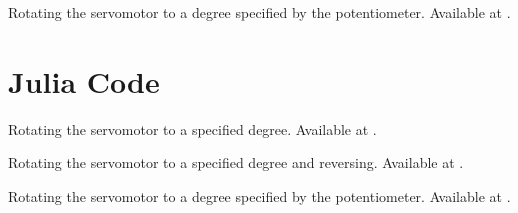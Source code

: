 \begin{pycode}
   {Rotating the servomotor to a degree specified by
    the potentiometer.  Available at .}
  \label{py:servo-pot}
  
\end{pycode}


\section{Julia Code}
\lstset{style=mystyle}
\label{sec:servo-julia-code}

\begin{juliacode}
   {Rotating
    the servomotor to a specified degree.  Available at
    .}
  \label{julia:servo-init}
  
\end{juliacode}

\begin{juliacode}
   {Rotating 
    the servomotor to a specified degree and reversing.  Available at
    .}
  \label{julia:servo-reverse}
  
\end{juliacode}

\begin{juliacode}
  \label{julia:servo-loop}
  
\end{juliacode}

\begin{juliacode}
   {Rotating the servomotor to a degree specified by
    the potentiometer.  Available at .}
  \label{julia:servo-pot}
  
\end{juliacode}




